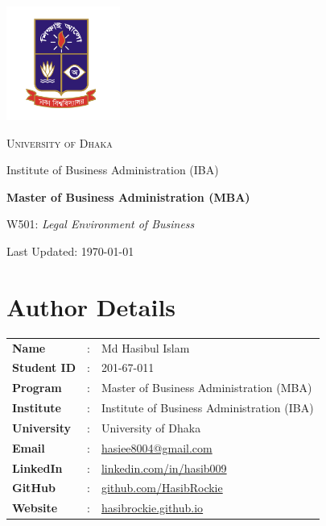 \documentclass[12pt,a4paper]{book}
\begin{document}
\begin{titlepage}
    \centering
    \vspace*{3.5cm}
    \includegraphics[width=0.28\textwidth]{logo.png}\par\vspace{1.5cm}
    {\scshape\LARGE University of Dhaka\par}
    \vspace{0.5cm}
    {\Large Institute of Business Administration (IBA)\par}
    \vspace{1.5cm}
    {\Huge\bfseries Master of Business Administration (MBA)\par}
    \vspace{1cm}
    {\Large W501: \textit{Legal Environment of Business}\par}
    \vfill
    {\large Last Updated: \today\par}
\end{titlepage}

\section*{Author Details}
{}

\begin{center}
    \vspace{1em}
    \begin{tabular}{lll}
        \textbf{Name} & : & Md Hasibul Islam \\
        \textbf{Student ID} & : & 201-67-011 \\
        \textbf{Program} & : & Master of Business Administration (MBA) \\
        \textbf{Institute} & : & Institute of Business Administration (IBA) \\
        \textbf{University} & : & University of Dhaka \\
        \textbf{Email} & : & \href{mailto:hasiee8004@gmail.com}{hasiee8004@gmail.com} \\
        \textbf{LinkedIn} & : & \href{https://www.linkedin.com/in/hasib009}{linkedin.com/in/hasib009} \\
        \textbf{GitHub} & : & \href{https://github.com/HasibRockie}{github.com/HasibRockie} \\
        \textbf{Website} & : & \href{https://hasibrockie.github.io}{hasibrockie.github.io} \\
    \end{tabular}
    \vspace{1em}
\end{center}
\end{document}
